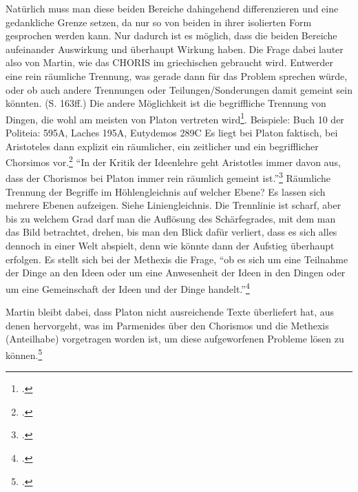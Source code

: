 Natürlich muss man diese beiden Bereiche dahingehend differenzieren und eine gedankliche Grenze setzen, da nur so von beiden in ihrer isolierten Form gesprochen werden kann. Nur dadurch ist es möglich, dass die beiden Bereiche aufeinander Auswirkung und überhaupt Wirkung haben.
Die Frage dabei lauter also von Martin, wie das CHORIS im griechischen gebraucht wird. Entwerder eine rein räumliche Trennung, was gerade dann für das Problem sprechen würde, oder ob auch andere Trennungen oder Teilungen/Sonderungen damit gemeint sein könnten. (S. 163ff.)
Die andere Möglichkeit ist die begriffliche Trennung von Dingen, die wohl am meisten von Platon vertreten wird\footcite[vgl.][S. 165]{Martin73}. Beispiele: Buch 10 der Politeia: 595A, Laches 195A, Eutydemos 289C
Es liegt bei Platon faktisch, bei Aristoteles dann explizit ein räumlicher, ein zeitlicher und ein begrifflicher Chorsimos vor.\footcite[vgl.][S. 166]{Martin73}
\enquote{In der Kritik der Ideenlehre geht Aristotles immer davon aus, dass der Chorismos bei Platon immer rein räumlich gemeint ist.}\footcite[][S. 166]{Martin73}
Räumliche Trennung der Begriffe im Höhlengleichnis auf welcher Ebene? Es lassen sich mehrere Ebenen aufzeigen. Siehe Liniengleichnis. Die Trennlinie ist scharf, aber bis zu welchem Grad darf man die Auflösung des Schärfegrades, mit dem man das Bild betrachtet, drehen, bis man den Blick dafür verliert, dass es sich alles dennoch in einer Welt abspielt, denn wie könnte dann der Aufstieg überhaupt erfolgen.
Es stellt sich bei der Methexis die Frage, \enquote{ob es sich um eine Teilnahme der Dinge an den Ideen oder um eine Anwesenheit der Ideen in den Dingen oder um eine Gemeinschaft der Ideen und der Dinge handelt.}\footcite[vgl.][S. 170]{Martin73}

Martin bleibt dabei, dass Platon nicht ausreichende Texte überliefert hat, aus denen hervorgeht, was im Parmenides über den Chorismos und die Methexis (Anteilhabe) vorgetragen worden ist, um diese aufgeworfenen Probleme lösen zu können.\footcite[vgl.][S. 173f.]{Martin73}

